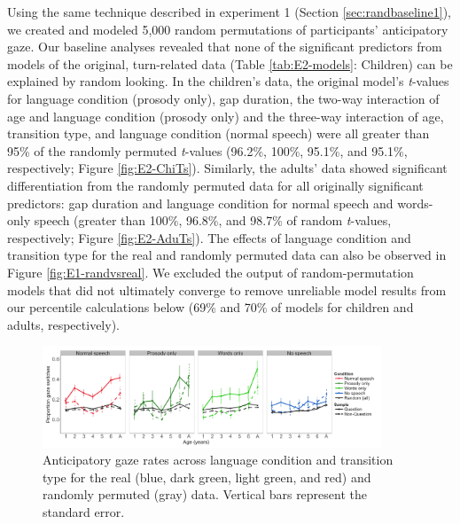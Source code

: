 \documentclass[authoryear, 12pt]{elsarticle}
\begin{document}
Using the same technique described in experiment 1 (Section \ref{sec:randbaseline1}), we created and modeled 5,000 random permutations of participants' anticipatory gaze. Our baseline analyses revealed that none of the significant predictors from models of the original, turn-related data (Table \ref{tab:E2-models}: Children) can be explained by random looking. In the children's data, the original model's \textit{t}-values for language condition (prosody only), gap duration, the two-way interaction of age and language condition (prosody only) and the three-way interaction of age, transition type, and language condition (normal speech) were all greater than 95\% of the randomly permuted \textit{t}-values (96.2\%, 100\%, 95.1\%, and 95.1\%, respectively; Figure \ref{fig:E2-ChiTs}). Similarly, the adults' data showed significant differentiation from the randomly permuted data for all originally significant predictors: gap duration and language condition for normal speech and words-only speech (greater than 100\%, 96.8\%, and 98.7\% of random \textit{t}-values, respectively; Figure \ref{fig:E2-AduTs}). The effects of language condition and transition type for the real and randomly permuted data can also be observed in Figure \ref{fig:E1-randvsreal}. We excluded the output of random-permutation models that did not ultimately converge to remove unreliable model results from our percentile calculations below (69\% and 70\% of models for children and adults, respectively). 

\begin{figure}[h]
\begin{center}
\includegraphics[width=0.9\textwidth]{figures/E2-samples-by-lang-groups-trans-types.png}
\end{center}
\caption{Anticipatory gaze rates across language condition and transition type for the real (blue, dark green, light green, and red) and randomly permuted (gray) data. Vertical bars represent the standard error.} 
\label{fig:E2-randvsreal}
\end{figure}
\end{document}
